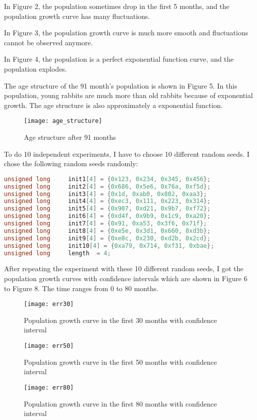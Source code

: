 \documentclass{article}
\begin{document}
    In Figure 2, the population sometimes drop in the first 5 months, and the population growth curve has many fluctuations. 
    
    In Figure 3, the population growth curve is much more smooth and fluctuations cannot be observed anymore. 
    
    In Figure 4, the population is a perfect exponential function curve, and the population explodes.
    
    The age structure of the 91 month's population is shown in Figure 5. In this population, young rabbits are much more than old rabbits because of exponential growth. The age structure is also approximately a exponential function.
    \begin{figure}
        \centering
        \texttt{[image: age\_structure]}
        \caption{Age structure after 91 months}
    \end{figure}
    
    To do 10 independent experiments, I have to choose 10 different random seeds. I chose the following random seeds randomly:
    
    \begin{lstlisting}[language=C]
unsigned long     init1[4] = {0x123, 0x234, 0x345, 0x456};
unsigned long     init2[4] = {0x686, 0x5e6, 0x76a, 0xf5d};
unsigned long     init3[4] = {0x1d, 0xab0, 0x802, 0xaa3};
unsigned long     init4[4] = {0xec3, 0x111, 0x223, 0x314};
unsigned long     init5[4] = {0x907, 0xd21, 0x9b7, 0xf72};
unsigned long     init6[4] = {0xd4f, 0x9b9, 0x1c9, 0xa20};
unsigned long     init7[4] = {0x91, 0xa53, 0x3f6, 0x71f};
unsigned long     init8[4] = {0xe5e, 0x3d1, 0x660, 0xd3b};
unsigned long     init9[4] = {0xe8c, 0x230, 0xd2b, 0x2cd};
unsigned long     init10[4] = {0xa79, 0x714, 0xf31, 0xbae};
unsigned long     length  = 4;
    \end{lstlisting}
    
    After repeating the experiment with these 10 different random seeds, I got the population growth curves with confidence intervals which are shown in Figure 6 to Figure 8. The time ranges from 0 to 80 months.
    
    \begin{figure}
        \centering
        \texttt{[image: err30]}
        \caption{Population growth curve in the first 30 months with confidence interval}
    \end{figure}
    \begin{figure}
        \centering
        \texttt{[image: err50]}
        \caption{Population growth curve in the first 50 months with confidence interval}
    \end{figure}
    \begin{figure}
        \centering
        \texttt{[image: err80]}
        \caption{Population growth curve in the first 80 months with confidence interval}
    \end{figure}
    
\end{document}
